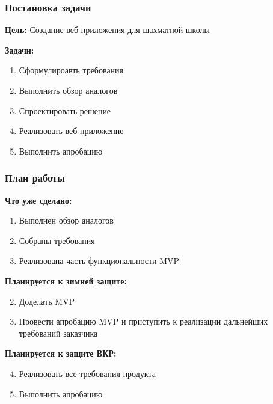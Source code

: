 \documentclass{vkr-slides-style}
\begin{document}
\begin{frame}  
    \frametitle{Постановка задачи}
    \textbf{Цель:} Создание веб-приложения для шахматной школы

    \vspace{5mm}
    \textbf{Задачи:}
    \begin{enumerate}
        \item Сформулироавть требования
        \item Выполнить обзор аналогов
        \item Спроектировать решение
        \item Реализовать веб-приложение
        \item Выполнить апробацию
    \end{enumerate}
\end{frame}

\begin{frame}  
    \frametitle{План работы}
    \textbf{Что уже сделано:}
    \begin{enumerate}
        \item Выполнен обзор аналогов
        \item Собраны требования
        \item Реализована часть функциональности MVP
    \end{enumerate}

    \textbf{Планируется к зимней защите:}
    \begin{enumerate}
        \setcounter{enumi}{1}
        \item Доделать MVP
        \item Провести апробацию MVP и приступить к реализации дальнейших требований заказчика
    \end{enumerate}

    \textbf{Планируется к защите ВКР:}
    \begin{enumerate}
        \setcounter{enumi}{3}
        \item Реализовать все требования продукта
        \item Выполнить апробацию
    \end{enumerate}
\end{frame}
\end{document}

